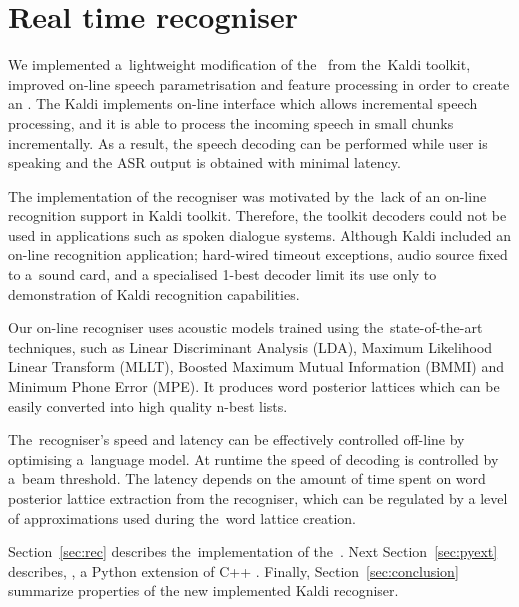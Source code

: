 \chapter{Real time recogniser}
\label{cha:decoder}

We implemented a~lightweight modification of the~ from the~Kaldi toolkit, improved on-line speech parametrisation and feature processing in order to create an .
The Kaldi  implements on-line interface which allows incremental speech processing, and it is able to process the incoming speech in small chunks incrementally.
As a result, the speech decoding can be performed while user is speaking and the ASR output is obtained with minimal latency.

The implementation of the recogniser was motivated by the~lack of an on-line recognition support in Kaldi toolkit.
Therefore, the toolkit decoders could not be used in applications such as spoken dialogue systems.
Although Kaldi included an on-line recognition application; hard-wired timeout exceptions, audio source fixed to a~sound card, and a specialised 1-best decoder limit its use only to demonstration of Kaldi recognition capabilities.

Our on-line recogniser uses acoustic models trained using the~state-of-the-art techniques, 
such as Linear Discriminant Analysis (LDA), Maximum Likelihood Linear Transform (MLLT), Boosted Maximum Mutual Information (BMMI) and Minimum Phone Error (MPE).
It produces word posterior lattices which can be easily converted into high quality n-best lists.

The~recogniser's speed and latency can be effectively controlled off-line by optimising a~language model. 
At runtime the speed of decoding is controlled by a~beam threshold.
The latency depends on the amount of time spent on word posterior lattice extraction from the recogniser, which can be regulated by a level of approximations used during the~word lattice creation.

Section~\ref{sec:rec} describes the~implementation of the~.
Next Section~\ref{sec:pyext} describes, , a Python extension of C++ .
Finally, Section~\ref{sec:conclusion} summarize properties of the new implemented Kaldi recogniser.

